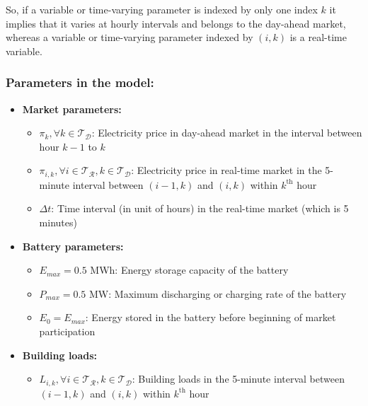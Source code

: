 \documentclass[11pt,twoside]{article}
\begin{document}
So, if a variable or time-varying parameter is indexed by only one index $k$ it implies that it varies at hourly intervals and belongs to the day-ahead market, whereas a variable or time-varying parameter indexed by $(i,k)$ is a real-time variable. 
\subsubsection{Parameters in the model:}
\begin{itemize}
\item\textbf{Market parameters:}
\begin{itemize}
\item[\textbullet] $\pi_{k}, \forall k \in \mathcal{T_D}$: Electricity price in day-ahead market in the interval between hour $k-1$ to $k$
\item[\textbullet] $\pi_{i,k}, \forall i \in \mathcal{T_R}, k \in \mathcal{T_D}$: Electricity price in real-time market in the 5-minute interval between $(i-1,k)$ and $(i,k)$ within $k^\text{th}$ hour
\item[\textbullet] $\Delta t$: Time interval (in unit of hours) in the real-time market (which is 5 minutes)
\end{itemize}
\item\textbf{Battery parameters:}
\begin{itemize}
\item[\textbullet] $E_{max} = 0.5$ MWh: Energy storage capacity of the battery
\item[\textbullet] $P_{max} = 0.5$ MW: Maximum discharging or charging rate of the battery
\item[\textbullet] $E_{0} = E_{max}$: Energy stored in the battery before beginning of market participation
\end{itemize}
\item\textbf{Building loads:}
\begin{itemize}
\item[\textbullet] $L_{i,k}, \forall i \in \mathcal{T_R}, k \in \mathcal{T_D}$: Building loads in the 5-minute interval between $(i-1,k)$ and $(i,k)$ within $k^\text{th}$ hour
\end{itemize}
\end{itemize}
\end{document}

